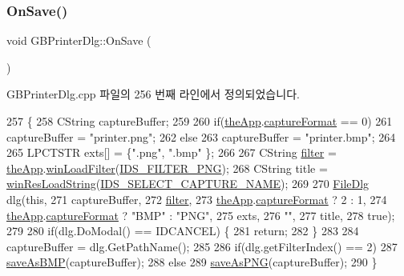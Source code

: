 \subsubsection{\texorpdfstring{On\+Save()}{OnSave()}}
{\footnotesize\ttfamily void G\+B\+Printer\+Dlg\+::\+On\+Save (\begin{DoxyParamCaption}{ }\end{DoxyParamCaption})\hspace{0.3cm}{\ttfamily [protected]}}



G\+B\+Printer\+Dlg.\+cpp 파일의 256 번째 라인에서 정의되었습니다.


\begin{DoxyCode}
257 \{
258   CString captureBuffer;
259 
260   \textcolor{keywordflow}{if}(\mbox{\hyperlink{_v_b_a_8cpp_a8095a9d06b37a7efe3723f3218ad8fb3}{theApp}}.\mbox{\hyperlink{class_v_b_a_a103f0b25433c57c4458a208a06799cf8}{captureFormat}} == 0)
261     captureBuffer = \textcolor{stringliteral}{"printer.png"};
262   \textcolor{keywordflow}{else}
263     captureBuffer = \textcolor{stringliteral}{"printer.bmp"};
264 
265   LPCTSTR exts[] = \{\textcolor{stringliteral}{".png"}, \textcolor{stringliteral}{".bmp"} \};
266 
267   CString \mbox{\hyperlink{_s_d_l_8cpp_af0122ee4312107103b580a98c74a4ea6}{filter}} = \mbox{\hyperlink{_v_b_a_8cpp_a8095a9d06b37a7efe3723f3218ad8fb3}{theApp}}.\mbox{\hyperlink{class_v_b_a_a228edf26b0dc4129658c174ee5a3c27c}{winLoadFilter}}(\mbox{\hyperlink{resource_8h_a374944c3928d8197bc2bbf9e85207a4d}{IDS\_FILTER\_PNG}});
268   CString title = \mbox{\hyperlink{_win_res_util_8cpp_a416e85e80ab9b01376e87251c83d1a5a}{winResLoadString}}(\mbox{\hyperlink{resource_8h_a10c24c77703afe57f6e641e939997cd2}{IDS\_SELECT\_CAPTURE\_NAME}});
269 
270   \mbox{\hyperlink{class_file_dlg}{FileDlg}} dlg(\textcolor{keyword}{this},
271               captureBuffer,
272               \mbox{\hyperlink{_s_d_l_8cpp_af0122ee4312107103b580a98c74a4ea6}{filter}},
273               \mbox{\hyperlink{_v_b_a_8cpp_a8095a9d06b37a7efe3723f3218ad8fb3}{theApp}}.\mbox{\hyperlink{class_v_b_a_a103f0b25433c57c4458a208a06799cf8}{captureFormat}} ? 2 : 1,
274               \mbox{\hyperlink{_v_b_a_8cpp_a8095a9d06b37a7efe3723f3218ad8fb3}{theApp}}.\mbox{\hyperlink{class_v_b_a_a103f0b25433c57c4458a208a06799cf8}{captureFormat}} ? \textcolor{stringliteral}{"BMP"} : \textcolor{stringliteral}{"PNG"},
275               exts,
276               \textcolor{stringliteral}{""},
277               title,
278               \textcolor{keyword}{true});
279 
280   \textcolor{keywordflow}{if}(dlg.DoModal() == IDCANCEL) \{
281     \textcolor{keywordflow}{return};
282   \}
283 
284   captureBuffer = dlg.GetPathName();
285 
286   \textcolor{keywordflow}{if}(dlg.getFilterIndex() == 2)
287     \mbox{\hyperlink{class_g_b_printer_dlg_a49404740bed8928cf83d77acb9dcaf83}{saveAsBMP}}(captureBuffer);
288   \textcolor{keywordflow}{else}
289     \mbox{\hyperlink{class_g_b_printer_dlg_ad776132a614d5e3bec1567f38d9c5d9c}{saveAsPNG}}(captureBuffer);
290 \}
\end{DoxyCode}
